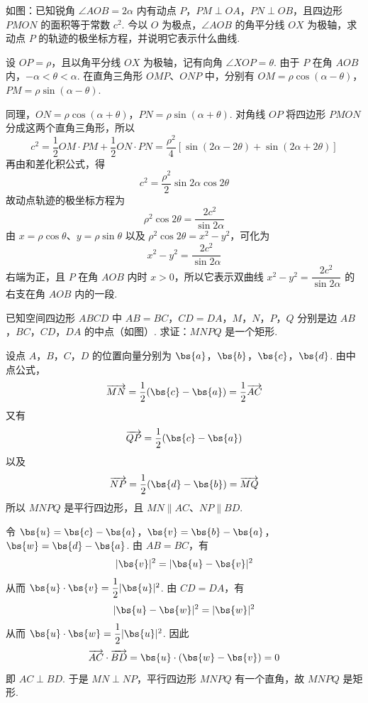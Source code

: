 \documentclass[UTF8,a4paper,oneside,11pt]{ctexbook}
\begin{document}
\begin{problem}

如图：已知锐角 \(\angle AOB=2\alpha\) 内有动点 \(P\)，\(PM\perp OA\)，\(PN\perp OB\)，且四边形 \(PMON\) 的面积等于常数 \(c^2\). 今以 \(O\) 为极点，\(\angle AOB\) 的角平分线 \(OX\) 为极轴，求动点 \(P\) 的轨迹的极坐标方程，并说明它表示什么曲线.

\end{problem}

\begin{solution}
设 \(OP=\rho\)，且以角平分线 \(OX\) 为极轴，记有向角 \(\angle XOP=\theta\). 由于 \(P\) 在角 \(AOB\) 内，\(-\alpha<\theta<\alpha\). 在直角三角形 \(OMP\)、\(ONP\) 中，分别有 \(OM=\rho\cos(\alpha-\theta)\)，\(PM=\rho\sin(\alpha-\theta)\).

同理，\(ON=\rho\cos(\alpha+\theta)\)，\(PN=\rho\sin(\alpha+\theta)\).
对角线 \(OP\) 将四边形 \(PMON\) 分成这两个直角三角形，所以
\[
c^2=\dfrac12OM\cdot PM+\dfrac12ON\cdot PN
=\dfrac{\rho^2}{4}\left[\sin(2\alpha-2\theta)+\sin(2\alpha+2\theta)\right]
\]
再由和差化积公式，得
\[
c^2=\dfrac{\rho^2}{2}\sin2\alpha\cos2\theta
\]
故动点轨迹的极坐标方程为
\[
\rho^2\cos2\theta=\dfrac{2c^2}{\sin2\alpha}
\]
由 \(x=\rho\cos\theta\)、\(y=\rho\sin\theta\) 以及 \(\rho^2\cos2\theta=x^2-y^2\)，可化为
\[
x^2-y^2=\dfrac{2c^2}{\sin2\alpha}
\]
右端为正，且 \(P\) 在角 \(AOB\) 内时 \(x>0\)，所以它表示双曲线 \(x^2-y^2=\dfrac{2c^2}{\sin2\alpha}\) 的右支在角 \(AOB\) 内的一段.
\end{solution}

\begin{problem}

已知空间四边形 \(ABCD\) 中 \(AB=BC\)，\(CD=DA\)，\(M\)，\(N\)，\(P\)，\(Q\) 分别是边 \(AB\)，\(BC\)，\(CD\)，\(DA\) 的中点（如图）. 求证：\(MNPQ\) 是一个矩形.

\begin{center}
\end{center}
\FloatBarrier
\end{problem}

\begin{solution}
设点 \(A\)，\(B\)，\(C\)，\(D\) 的位置向量分别为 \(\bs{a}\)，\(\bs{b}\)，\(\bs{c}\)，\(\bs{d}\). 由中点公式，
\[
\overrightarrow{MN}=\dfrac12(\bs{c}-\bs{a})=\dfrac12\overrightarrow{AC}
\]
又有
\[
\overrightarrow{QP}=\dfrac12(\bs{c}-\bs{a})
\]
以及
\[
\overrightarrow{NP}=\dfrac12(\bs{d}-\bs{b})=\overrightarrow{MQ}
\]
所以 \(MNPQ\) 是平行四边形，且 \(MN\parallel AC\)、\(NP\parallel BD\).

令 \(\bs{u}=\bs{c}-\bs{a}\)，\(\bs{v}=\bs{b}-\bs{a}\)，\(\bs{w}=\bs{d}-\bs{a}\). 由 \(AB=BC\)，有
\[
|\bs{v}|^2=|\bs{u}-\bs{v}|^2
\]
从而 \(\bs{u}\cdot\bs{v}=\dfrac12|\bs{u}|^2\). 由 \(CD=DA\)，有
\[
|\bs{u}-\bs{w}|^2=|\bs{w}|^2
\]
从而 \(\bs{u}\cdot\bs{w}=\dfrac12|\bs{u}|^2\). 因此
\[
\overrightarrow{AC}\cdot\overrightarrow{BD}=\bs{u}\cdot(\bs{w}-\bs{v})=0
\]
即 \(AC\perp BD\). 于是 \(MN\perp NP\)，平行四边形 \(MNPQ\) 有一个直角，故 \(MNPQ\) 是矩形.
\end{solution}
\end{document}
